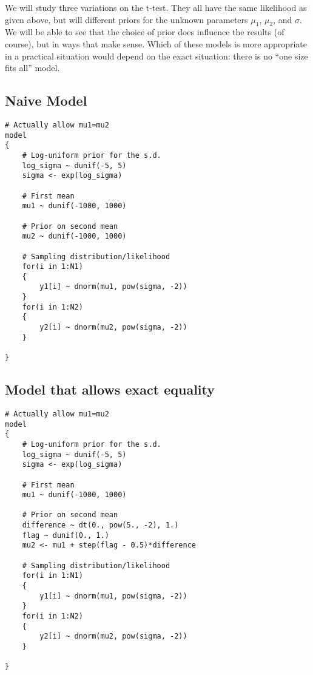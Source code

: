 We will study three variations on the t-test. They all have the same likelihood
as given above,
but will different priors for the unknown parameters $\mu_1$, $\mu_2$, and
$\sigma$.
We will be able to see that the choice of prior does
influence the results (of course), but in ways that make sense. Which of these
models is more appropriate in a practical situation would depend on the exact
situation: there is no ``one size fits all'' model.

\subsection{Naive Model}

\begin{framed}
\begin{verbatim}
# Actually allow mu1=mu2
model
{
    # Log-uniform prior for the s.d.
    log_sigma ~ dunif(-5, 5)
    sigma <- exp(log_sigma)

    # First mean
    mu1 ~ dunif(-1000, 1000)

    # Prior on second mean
    mu2 ~ dunif(-1000, 1000)

    # Sampling distribution/likelihood
    for(i in 1:N1)
    {
        y1[i] ~ dnorm(mu1, pow(sigma, -2))
    }
    for(i in 1:N2)
    {
        y2[i] ~ dnorm(mu2, pow(sigma, -2))
    }

}
\end{verbatim}
\end{framed}

\subsection{Model that allows exact equality}

\begin{framed}
\begin{verbatim}
# Actually allow mu1=mu2
model
{
    # Log-uniform prior for the s.d.
    log_sigma ~ dunif(-5, 5)
    sigma <- exp(log_sigma)

    # First mean
    mu1 ~ dunif(-1000, 1000)

    # Prior on second mean
    difference ~ dt(0., pow(5., -2), 1.)
    flag ~ dunif(0., 1.)
    mu2 <- mu1 + step(flag - 0.5)*difference

    # Sampling distribution/likelihood
    for(i in 1:N1)
    {
        y1[i] ~ dnorm(mu1, pow(sigma, -2))
    }
    for(i in 1:N2)
    {
        y2[i] ~ dnorm(mu2, pow(sigma, -2))
    }

}
\end{verbatim}
\end{framed}


